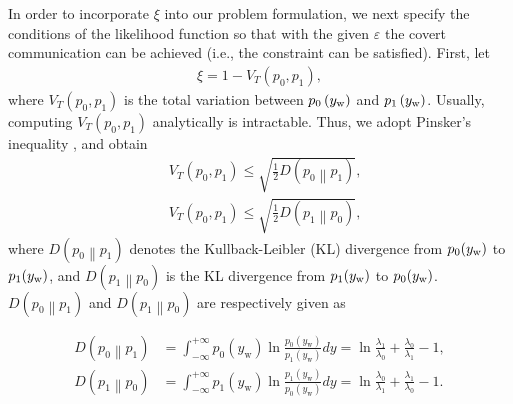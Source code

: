 \documentclass[10pt,journal,letterpaper,twocolumn,twoside]{IEEEtran} %
\begin{document}
In order to incorporate $\xi$ into our problem formulation,  we next specify the conditions of the likelihood function so that with the given $\varepsilon$ the covert communication can be achieved (i.e., the constraint can be satisfied).
First, let
\begin{align}\label{C_7}
\xi
 = 1 - { V_T}\left( {{p_0},{p_1}} \right),
\end{align}
where ${V_T}\left( {{p_0},{p_1}} \right)$ is the total variation between ${p_0}\left( {{y_{\rm{w}}}} \right)$ and
${p_1}\left( {{y_{\rm{w}}}} \right)$.
Usually, computing ${V_T}\left( {{p_0},{p_1}} \right)$
analytically is intractable. Thus, we adopt  Pinsker's inequality \cite{Cover_2003_Elements}, and obtain
\begin{subequations}
\begin{align}
& { V_T}\left( {{p_0},{p_1}} \right) \le \sqrt {\frac{1}{2}D\left( {{p_0}\left\| {{p_1}} \right.} \right)},  \label{C_3}\\
 &{ V_T}\left( {{p_0},{p_1}} \right) \le \sqrt {\frac{1}{2}D\left( {{p_1}\left\| {{p_0}} \right.} \right)},\label{C_4}
\end{align}
  \end{subequations}
where $D\left( {{p_0}\left\| {{p_1}} \right.} \right)$ denotes the Kullback-Leibler (KL) divergence from $p_0(y_{\rm{w}})$ to $p_1(y_{\rm{w}})$, and
$D\left( {{p_1}\left\| {{p_0}} \right.} \right)$ is the KL divergence from $p_1(y_{\rm{w}})$ to $p_0(y_{\rm{w}})$.
$D\left( {{p_0}\left\| {{p_1}} \right.} \right)$   and
$D\left( {{p_1}\left\| {{p_0}} \right.} \right)$ are respectively given as

  \begin{small}
 \begin{subequations}
\begin{align}
  D\left( {{p_0}\left\| {{p_1}} \right.} \right) &= \int_{ - \infty }^{ + \infty } {{p_0}\left( {{y_{\text{w}}}} \right)\ln \frac{{{p_0}\left( {{y_{\text{w}}}} \right)}}{{{p_1}\left( {{y_{\text{w}}}} \right)}}} dy  = \ln \frac{{{\lambda _1}}}{{{\lambda _0}}} + \frac{{{\lambda _0}}}{{{\lambda _1}}} - 1, \label{C_5}\\
  D\left( {{p_1}\left\| {{p_0}} \right.} \right) &= \int_{ - \infty }^{ + \infty } {{p_1}\left( {{y_{\text{w}}}} \right)\ln \frac{{{p_1}\left( {{y_{\text{w}}}} \right)}}{{{p_0}\left( {{y_{\text{w}}}} \right)}}} dy = \ln \frac{{{\lambda _0}}}{{{\lambda _1}}} + \frac{{{\lambda _1}}}{{{\lambda _0}}} - 1. \label{C_6}
  \end{align}
\end{subequations}
\end{small}
\end{document}
